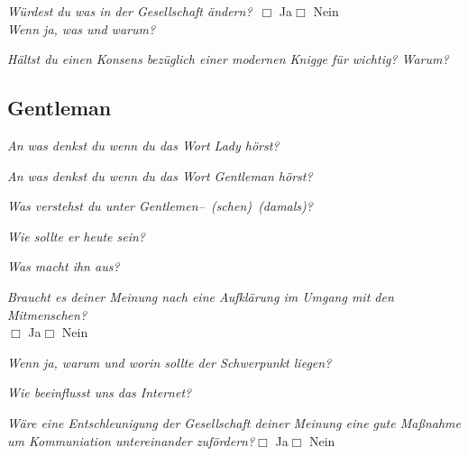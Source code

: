 \documentclass[a4paper,12pt]{scrartcl}
\newcommand{\checkbox}{\(\Box\)}
\newcommand{\frage}[1]{\textit{#1}}
\begin{document}
\frage{Würdest du was in der Gesellschaft ändern?}\ \checkbox{} Ja\hspace{0.8cm}\checkbox{} Nein\\
\frage{Wenn ja, was und warum?}
\vspace{3cm}

\frage{Hältst du einen Konsens bezüglich einer modernen Knigge für wichtig? Warum?}
\vspace{3cm}
\newpage
\subsection*{Gentleman}

\frage{An was denkst du wenn du das Wort Lady hörst?}
\vspace{3cm}

\frage{An was denkst du wenn du das Wort Gentleman hörst?}
\vspace{3cm}

\frage{Was verstehst du unter Gentlemen--\ (schen)\ (damals)?}
\vspace{2cm} 

\frage{Wie sollte er heute sein?}
\vspace{2cm}

\frage{Was macht ihn aus?}
\vspace{2cm}

\newpage
\frage{Braucht es deiner Meinung nach eine Aufklärung im Umgang mit den Mitmenschen?}\\
\checkbox{} Ja\hspace{0.8cm}\checkbox{} Nein \par
\frage{Wenn ja, warum und worin sollte der Schwerpunkt liegen?}
\vspace{3cm}

\frage{Wie beeinflusst uns das Internet?}
\vspace{4cm}

\frage{Wäre eine Entschleunigung der Gesellschaft deiner Meinung eine gute Maßnahme um Kommuniation untereinander zufördern?}\hfill\checkbox{} Ja\hspace{0.8cm}\checkbox{} Nein
\end{document}
